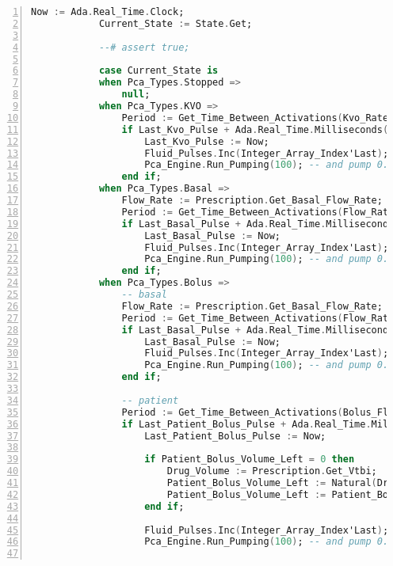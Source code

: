 \begin{lstlisting}[language=ada, gobble=0, numbers=left, caption={\lstinline{Pca_Operation} package}, label={listing:pca_ravenscar:pca_operation}]
            Now := Ada.Real_Time.Clock;
            Current_State := State.Get;

            --# assert true;

            case Current_State is
            when Pca_Types.Stopped =>
                null;
            when Pca_Types.KVO =>
                Period := Get_Time_Between_Activations(Kvo_Rate);
                if Last_Kvo_Pulse + Ada.Real_Time.Milliseconds(Period) <= Now then
                    Last_Kvo_Pulse := Now;
                    Fluid_Pulses.Inc(Integer_Array_Index'Last); -- each time round, update the volume infused
                    Pca_Engine.Run_Pumping(100); -- and pump 0.1 ml
                end if;
            when Pca_Types.Basal =>
                Flow_Rate := Prescription.Get_Basal_Flow_Rate;
                Period := Get_Time_Between_Activations(Flow_Rate);
                if Last_Basal_Pulse + Ada.Real_Time.Milliseconds(Period) <= Now then
                    Last_Basal_Pulse := Now;
                    Fluid_Pulses.Inc(Integer_Array_Index'Last); -- each time round, update the volume infused
                    Pca_Engine.Run_Pumping(100); -- and pump 0.1 ml
                end if;
            when Pca_Types.Bolus =>
                -- basal
                Flow_Rate := Prescription.Get_Basal_Flow_Rate;
                Period := Get_Time_Between_Activations(Flow_Rate);
                if Last_Basal_Pulse + Ada.Real_Time.Milliseconds(Period) <= Now then
                    Last_Basal_Pulse := Now;
                    Fluid_Pulses.Inc(Integer_Array_Index'Last); -- each time round, update the volume infused
                    Pca_Engine.Run_Pumping(100); -- and pump 0.1 ml
                end if;

                -- patient
                Period := Get_Time_Between_Activations(Bolus_Flow_Rate);
                if Last_Patient_Bolus_Pulse + Ada.Real_Time.Milliseconds(Period) <= Now then
                    Last_Patient_Bolus_Pulse := Now;

                    if Patient_Bolus_Volume_Left = 0 then
                        Drug_Volume := Prescription.Get_Vtbi;
                        Patient_Bolus_Volume_Left := Natural(Drug_Volume);
                        Patient_Bolus_Volume_Left := Patient_Bolus_Volume_Left * 1000; -- convert to microliters
                    end if;

                    Fluid_Pulses.Inc(Integer_Array_Index'Last); -- each time round, update the volume infused
                    Pca_Engine.Run_Pumping(100); -- and pump 0.1 ml


\end{lstlisting}
